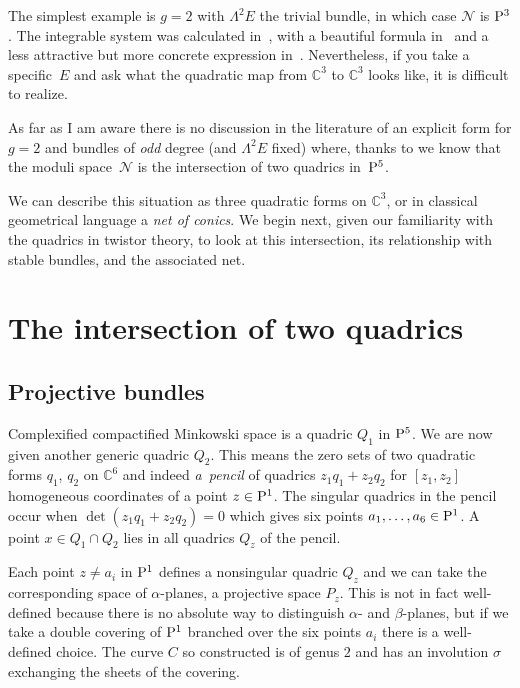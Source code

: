\documentclass[10pt,a4paper]{amsart}
\numberwithin{equation}{section}
\begin{document}
The simplest example is $g=2$ with $\Lambda^2E$ the trivial bundle, in which case ${\mathcal N}$ is ${\rm P}^3$. The integrable system was calculated in~\cite{Geemen/Previato}, with a beautiful formula in~\cite{Gawedzki/Bich} and a less attractive but more concrete expression in~\cite{Loray/Heu}. Nevertheless, if you take a specific~$E$ and ask what the quadratic map from ${\mathbb C}^3$ to ${\mathbb C}^3$ looks like, it is difficult to realize.

As far as I am aware there is no discussion in the literature of an explicit form for $g=2$ and bundles of {\it odd} degree (and $\Lambda^2E$ fixed) where, thanks to \cite{Narasimhan/Ramanan1969,Newstead} we know that the moduli space~${\mathcal N}$ is the intersection of two quadrics in~${\rm P}^5$.

 We can describe this situation as three quadratic forms on ${\mathbb C}^3$, or in classical geometrical language a {\it net of conics}. We begin next, given our familiarity with the quadrics in twistor theory, to look at this intersection, its relationship with stable bundles, and the associated net.

\section{The intersection of two quadrics}
\subsection{Projective bundles}
Complexified compactified Minkowski space is a quadric $Q_1$ in ${\rm P}^5$. We are now given another generic quadric $Q_2$. This means the zero sets of two quadratic forms $q_1$, $q_2$ on ${\mathbb C}^6$ and indeed {\it a~pencil} of quadrics $z_1q_1+z_2q_2$ for $[z_1,z_2]$ homogeneous coordinates of a point $z\in {\rm P}^1$. The singular quadrics in the pencil occur when $\det (z_1q_1+z_2q_2)=0$ which gives six points \mbox{$a_1,\dots, a_6\in {\rm P}^1$}. A point $x\in Q_1\cap Q_2$ lies in all quadrics $Q_z$ of the pencil.

Each point $z\ne a_i$ in ${\rm P}^1$ defines a nonsingular quadric $Q_z$ and we can take the corresponding space of $\alpha$-planes, a projective space $P_z$. This is not in fact well-defined because there is no absolute way to distinguish $\alpha$- and $\beta$-planes, but if we take a double covering of ${\rm P}^1$ branched over the six points $a_i$ there is a well-defined choice. The curve $C$ so constructed is of genus $2$ and has an involution $\sigma$ exchanging the sheets of the covering.
\end{document}
